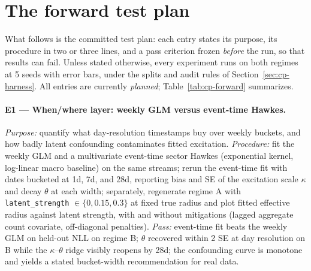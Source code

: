 \section{The forward test plan}
\label{sec:cp-forward}

What follows is the committed test plan: each entry states its purpose, its procedure in two or three
lines, and a pass criterion frozen \emph{before} the run, so that results can fail. Unless stated
otherwise, every experiment runs on both regimes at 5 seeds with error bars, under the splits and audit
rules of Section~\ref{sec:cp-harness}. All entries are currently \emph{planned};
Table~\ref{tab:cp-forward} summarizes.

\paragraph{E1 --- When/where layer: weekly GLM versus event-time Hawkes.}
\emph{Purpose:} quantify what day-resolution timestamps buy over weekly buckets, and how badly latent
confounding contaminates fitted excitation. \emph{Procedure:} fit the weekly GLM and a multivariate
event-time sector Hawkes (exponential kernel, log-linear macro baseline) on the same streams; rerun the
event-time fit with dates bucketed at 1d, 7d, and 28d, reporting bias and SE of the excitation scale
$\kappa$ and decay $\theta$ at each width; separately, regenerate regime A with
\texttt{latent\_strength} $\in \{0, 0.15, 0.3\}$ at fixed true radius and plot fitted effective radius
against latent strength, with and without mitigations (lagged aggregate count covariate, off-diagonal
penalties). \emph{Pass:} event-time fit beats the weekly GLM on held-out NLL on regime B; $\theta$
recovered within 2 SE at day resolution on B while the $\kappa$--$\theta$ ridge visibly reopens by 28d; the
confounding curve is monotone and yields a stated bucket-width recommendation for real data.

